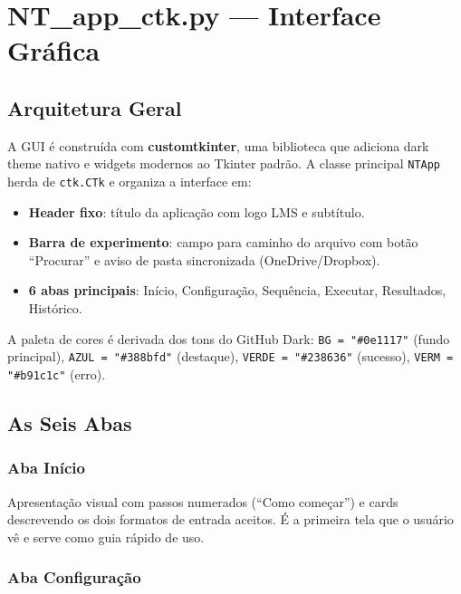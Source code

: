 \documentclass[12pt,a4paper]{report}
\newcommand{\code}[1]{\texttt{#1}}
\begin{document}
\chapter{NT\_app\_ctk.py — Interface Gráfica}
\label{cap:gui}

\section{Arquitetura Geral}

A GUI é construída com \textbf{customtkinter}, uma biblioteca que adiciona
dark theme nativo e widgets modernos ao Tkinter padrão. A classe principal
\code{NTApp} herda de \code{ctk.CTk} e organiza a interface em:

\begin{itemize}
  \item \textbf{Header fixo}: título da aplicação com logo LMS e subtítulo.
  \item \textbf{Barra de experimento}: campo para caminho do arquivo com botão
    ``Procurar'' e aviso de pasta sincronizada (OneDrive/Dropbox).
  \item \textbf{6 abas principais}: Início, Configuração, Sequência, Executar,
    Resultados, Histórico.
\end{itemize}

A paleta de cores é derivada dos tons do GitHub Dark:
\code{BG = "\#0e1117"} (fundo principal), \code{AZUL = "\#388bfd"} (destaque),
\code{VERDE = "\#238636"} (sucesso), \code{VERM = "\#b91c1c"} (erro).

\section{As Seis Abas}

\subsection{Aba Início}

Apresentação visual com passos numerados (``Como começar'') e cards
descrevendo os dois formatos de entrada aceitos. É a primeira tela que
o usuário vê e serve como guia rápido de uso.

\subsection{Aba Configuração}
\end{document}
